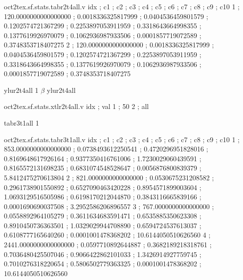 \begin{filecontents}[overwrite]{oct2tex.sf.stats.tabr2t4all.v}
idx ; c1 ; c2 ; c3 ; c4 ; c5 ; c6 ; c7 ; c8 ; c9 ; c10
1 ; 120.0000000000000000 ; 0.0018336325817999 ; 0.0404536459801579 ; 0.1202574721367299 ; 0.2253897053911959 ; 0.3318643664998355 ; 0.1377619926970079 ; 0.1062936987933506 ; 0.0001857719072589 ; 0.3748353718407275
2 ; 120.0000000000000000 ; 0.0018336325817999 ; 0.0404536459801579 ; 0.1202574721367299 ; 0.2253897053911959 ; 0.3318643664998355 ; 0.1377619926970079 ; 0.1062936987933506 ; 0.0001857719072589 ; 0.3748353718407275
\end{filecontents}
\expandafter\def\csname oct2tex.sf.stats.ylur2t4all.t\endcsname{ylur2t4all}
\expandafter\def\csname oct2tex.sf.stats.ylur2t4all.u\endcsname{1}
\expandafter\def\csname oct2tex.sf.stats.ylur2t4all.v\endcsname{$\beta$}
\expandafter\def\csname oct2tex.sf.stats.xtlr2t4all.t\endcsname{ylur2t4all}
\begin{filecontents}[overwrite]{oct2tex.sf.stats.xtlr2t4all.v}
idx ; val
1 ; 50
2 ; all
\end{filecontents}
\expandafter\def\csname oct2tex.sf.stats.tabr3t1all.t\endcsname{tabr3t1all}
\expandafter\def\csname oct2tex.sf.stats.tabr3t1all.u\endcsname{1}
\begin{filecontents}[overwrite]{oct2tex.sf.stats.tabr3t1all.v}
idx ; c1 ; c2 ; c3 ; c4 ; c5 ; c6 ; c7 ; c8 ; c9 ; c10
1 ; 853.0000000000000000 ; 0.0738493612250541 ; 0.4720296951828016 ; 0.8169648617926164 ; 0.9377350416761006 ; 1.7230029060439591 ; 0.8165572131698235 ; 0.6831074548528647 ; 0.0056876800839379 ; 5.8412475270613804
2 ; 821.0000000000000000 ; 0.0530675231208582 ; 0.2961738901550892 ; 0.6527090463420228 ; 0.8954571899003604 ; 1.0693129516505986 ; 0.6198170212044870 ; 0.3843116665839166 ; 0.0001690690037508 ; 3.2952586206896557
3 ; 767.0000000000000000 ; 0.0558892964105279 ; 0.3611634683591471 ; 0.6535885350623308 ; 0.8910450736363501 ; 1.0329029944708890 ; 0.6594724537613037 ; 0.6108777165640260 ; 0.0001001478368202 ; 10.6144050510626560
4 ; 2441.0000000000000000 ; 0.0597710892644887 ; 0.3682189218318761 ; 0.7036480425507046 ; 0.9066422862101033 ; 1.3426914927759745 ; 0.7010276318220654 ; 0.5806502779363325 ; 0.0001001478368202 ; 10.6144050510626560
\end{filecontents}
